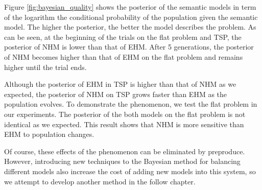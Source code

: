 Figure \ref{fig:bayesian_quality} shows the posterior of the semantic models in term of the logarithm the conditional probability of the population given the semantic model. The higher the posterior, the better the model describes the problem. As can be seen, at the beginning of the trials on the flat problem and TSP, the posterior of NHM is lower than that of EHM. After 5 generations, the posterior of NHM becomes higher than that of EHM on the flat problem and remains higher until the trial ends. 

Although the posterior of EHM in TSP is higher than that of NHM as we expected, the posterior of NHM on TSP grows faster than EHM as the population evolves. To demonstrate the phenomenon, we test the flat problem in our experiments. The posterior of the both models on the flat problem is not identical as we expected. This result shows that NHM is more sensitive than EHM to population changes.

Of course, these effects of the phenomenon can be eliminated by preproduce. However, introducing new techniques to the Bayesian method for balancing different models also increase the cost of adding new models into this system, so we attempt to develop another method in the follow chapter.